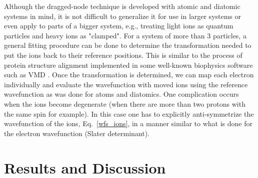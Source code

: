 \documentclass[pra,superscriptaddress,groupedaddress,twocolumn]{revtex4}
\begin{document}
Although the dragged-node technique is developed with atomic and diatomic systems in mind, it is not difficult to generalize it for use in larger systems or even apply to parts of a bigger system, e.g., treating light ions as quantum particles and heavy ions as "clamped". For a system of more than 3 particles, a general fitting procedure \cite{Kabsch_Rotation} can be done to determine the transformation needed to put the ions back to their reference positions. This is similar to the process of protein structure alignment implemented in some well-known biophysics software such as VMD \cite{VMD}. Once the transformation is determined, we can map each electron individually and evaluate the wavefunction with moved ions using the reference wavefunction as was done for atoms and diatomics. One complication occurs when the ions become degenerate (when there are more than two protons with the same spin for example). In this case one has to explicitly anti-symmetrize the wavefunction of the ions, Eq.~\eqref{wfs_ions}, in a manner similar to what is done for the electron wavefunction (Slater determinant). 

\section{Results and Discussion}
\end{document}
